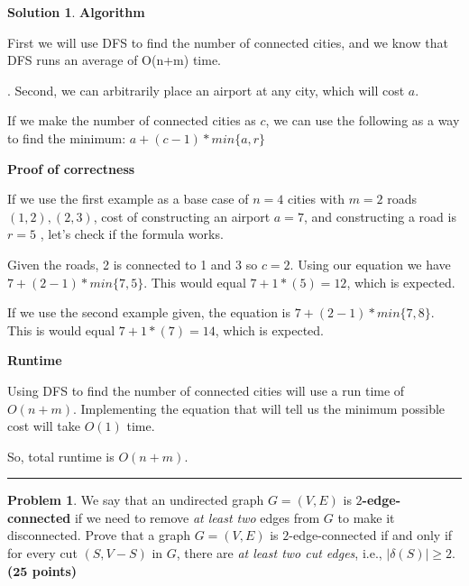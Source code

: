 \documentclass{article}
\theoremstyle{definition}
\newtheorem{problem}{Problem}
\def\fline{\rule{0.75\linewidth}{0.5pt}}
\newcommand{\finishline}{\begin{center}\fline\end{center}}
\newtheorem*{solution*}{Solution}
\newenvironment{solution}{\begin{solution*}}{{\finishline} \end{solution*}}
\newcommand{\grade}[1]{\hfill{\textbf{($\mathbf{#1}$ points)}}}
\begin{document}
\begin{solution}
\textbf{Algorithm}
\item First we will use DFS to find the number of connected cities, and we know that DFS runs an average of O(n+m) time.
\item. Second, we can arbitrarily place an airport at any city, which will cost $a$.
\item If we make the number of connected cities as $c$, we can use the following as a way to find the minimum: $a + (c - 1) * min\{a, r\}$

\item \textbf{Proof of correctness}
\item If we use the first example as a base case of  $n=4$ cities with $m=2$ roads $(1,2), (2,3)$, cost of constructing an airport $a = 7$, and constructing a road is $r=5$ , let's check if the formula works.
\item Given the roads, 2 is connected to 1 and 3 so $c = 2$. Using our equation we have $7 + (2 - 1) * min\{7, 5\}$. This would equal $7 + 1*(5) = 12$, which is expected.
\item If we use the second example given, the equation is $7 + (2 - 1) * min\{7, 8\}$. This is would equal  $7 + 1*(7) = 14$, which is expected.

\item \textbf{Runtime}
\item Using DFS to find the number of connected cities will use a run time of $O(n + m)$. Implementing the equation that will tell us the minimum possible cost will take $O(1)$ time.
\item So, total runtime is $O(n+m)$.
 
\end{solution}



\begin{problem}
	We say that an undirected graph $G=(V,E)$ is \textbf{$2$-edge-connected} if we need to remove \emph{at least two} edges from $G$ to make it disconnected. Prove that a 
	graph $G=(V,E)$ is $2$-edge-connected if and only if for every cut $(S,V-S)$ in $G$, there are \emph{at least two cut edges}, i.e., $|{\delta(S)}| \geq 2$. \grade{25}
\end{problem}


\medskip
\end{document}
